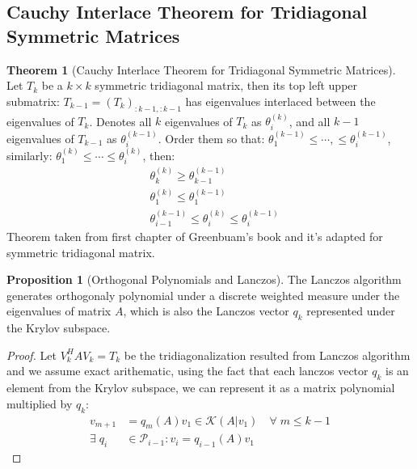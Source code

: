 \documentclass[]{article}
\theoremstyle{definition}
\newtheorem{theorem}{Theorem}            %
\newtheorem{prop}{Proposition}[section]  %
\begin{document}
\begin{appendices}
        \subsection{Cauchy Interlace Theorem for Tridiagonal Symmetric Matrices}
            \begin{theorem}[Cauchy Interlace Theorem for Tridiagonal Symmetric Matrices]\label{theorem:cauchy_interlace}
                Let $T_k$ be a $k\times k$ symmetric tridiagonal matrix, then its top left upper submatrix: $T_{k-1}=(T_k)_{:k - 1, :k -1}$ has eigenvalues interlaced between the eigenvalues of $T_k$. Denotes all $k$ eigenvalues of $T_k$ as $\theta_i^{(k)}$, and all $k - 1$ eigenvalues of $T_{k - 1}$ as $\theta_i^{(k - 1)}$. Order them so that: $\theta_1^{(k - 1)} \le \cdots, \le \theta_i^{(k - 1)}$, similarly: $\theta_1^{(k)}\le \cdots \le \theta_i^{(k)}$, then: 
                \begin{align}
                    & \theta_{k}^{(k)} \ge \theta_{k - 1}^{(k - 1)}
                    \\
                    & \theta_{1}^{(k)} \le \theta_{1}^{(k - 1)}
                    \\
                    & \theta_{i -1}^{(k - 1)} \le \theta_{i}^{(k)} \le \theta_{i}^{(k - 1)}
                \end{align}
                Theorem taken from first chapter of Greenbuam's book\cite{book:greenbaum} and it's adapted for symmetric tridiagonal matrix. 
            \end{theorem}
        \begin{prop}[Orthogonal Polynomials and Lanczos]\label{prop:Orthogonal_Polynomials_and_Lanczos}
            The Lanczos algorithm generates orthogonaly polynomial under a discrete weighted measure under the eigenvalues of matrix $A$, which is also the Lanczos vector $q_k$ represented under the Krylov subspace. 
        \end{prop}
        \begin{proof}
            Let $V_k^HAV_k = T_k$ be the tridiagonalization resulted from Lanczos algorithm and we assume exact arithematic, using the fact that each lanczos vector $q_k$ is an element from the Krylov subspace, we can represent it as a matrix polynomial multiplied by $q_k$: 
            \begin{align}
                v_{m + 1} &= q_{m}(A)v_1 \in \mathcal{K}(A|v_1) \quad \forall\; m \le k - 1
                \\
                \exists\; q_{i} &\in \mathcal{P}_{i - 1}: v_i = q_{i - 1}(A) v_1

\end{align}
\end{proof}
\end{appendices}
\end{document}
